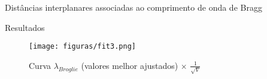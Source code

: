 \begin{frame}{Distâncias
interplanares associadas ao comprimento de onda de Bragg}

    \begin{table}[h!]
    \centering
    \caption{Valores de $\lambda_{Bragg}$ e $d$ (distâncias
interplanares), ambos em ångströms (\AA), para cada medida.}
    \end{table}
    

\end{frame}


\begin{frame}{Resultados}

        \begin{center}
        \begin{figure}
        \caption{Curva $\lambda_{Broglie}$ (valores melhor ajustados) $\times$ $\frac{1}{\sqrt{V}}$}
        \vspace*{-0.25cm}
        \texttt{[image: figuras/fit3.png]}\par
        \end{figure}
        \end{center}
    
\end{frame}

